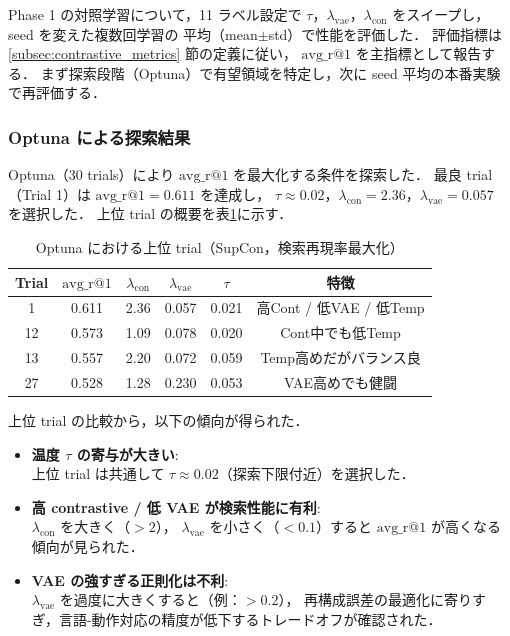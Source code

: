 Phase 1 の対照学習について，11 ラベル設定で
$\tau$，$\lambda_{\mathrm{vae}}$，$\lambda_{\mathrm{con}}$ をスイープし，seed を変えた複数回学習の
平均（mean$\pm$std）で性能を評価した．
評価指標は \ref{subsec:contrastive_metrics} 節の定義に従い，
$\mathrm{avg\_r@1}$ を主指標として報告する．
まず探索段階（Optuna）で有望領域を特定し，次に seed 平均の本番実験で再評価する．

\subsubsection{Optuna による探索結果}
\label{subsubsec:optuna_results}

Optuna（30 trials）により $\mathrm{avg\_r@1}$ を最大化する条件を探索した．
最良 trial（Trial 1）は $\mathrm{avg\_r@1}=0.611$ を達成し，
$\tau\approx 0.02$，$\lambda_{\mathrm{con}}=2.36$，$\lambda_{\mathrm{vae}}=0.057$ を選択した．
上位 trial の概要を表\ref{tab:optuna_top_trials}に示す．

\begin{table}[H]
  \centering
  \caption{Optuna における上位 trial（SupCon，検索再現率最大化）}
  \label{tab:optuna_top_trials}
  \begin{tabular}{cccccc} \toprule
    \textbf{Trial} & $\mathrm{avg\_r@1}$ & $\lambda_{\mathrm{con}}$ & $\lambda_{\mathrm{vae}}$ & $\tau$ & \textbf{特徴}           \\ \midrule
    1              & 0.611               & 2.36                     & 0.057                    & 0.021  & 高Cont / 低VAE / 低Temp \\
    12             & 0.573               & 1.09                     & 0.078                    & 0.020  & Cont中でも低Temp        \\
    13             & 0.557               & 2.20                     & 0.072                    & 0.059  & Temp高めだがバランス良  \\
    27             & 0.528               & 1.28                     & 0.230                    & 0.053  & VAE高めでも健闘         \\ \bottomrule
  \end{tabular}
\end{table}

上位 trial の比較から，以下の傾向が得られた．
\begin{itemize}
  \item \textbf{温度 $\tau$ の寄与が大きい}:\\
    上位 trial は共通して $\tau\approx 0.02$（探索下限付近）を選択した．
  \item \textbf{高 contrastive / 低 VAE が検索性能に有利}:\\
    $\lambda_{\mathrm{con}}$ を大きく（$>2$），
    $\lambda_{\mathrm{vae}}$ を小さく（$<0.1$）すると $\mathrm{avg\_r@1}$ が高くなる傾向が見られた．
  \item \textbf{VAE の強すぎる正則化は不利}:\\
    $\lambda_{\mathrm{vae}}$ を過度に大きくすると（例：$>0.2$），
    再構成誤差の最適化に寄りすぎ，言語-動作対応の精度が低下するトレードオフが確認された．
\end{itemize}


